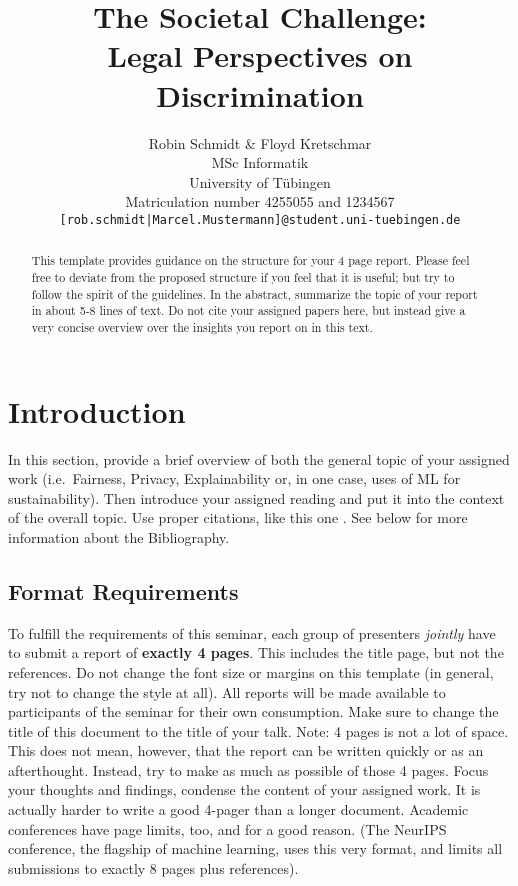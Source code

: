\documentclass{article}
\title{The Societal Challenge: \\ Legal Perspectives on Discrimination}
\author{%
  Robin Schmidt \& Floyd Kretschmar\\
  MSc Informatik \\
  University of Tübingen\\
  Matriculation number 4255055 and 1234567\\
  \texttt{[rob.schmidt|Marcel.Mustermann]@student.uni-tuebingen.de}
}
\begin{document}
\maketitle

\begin{abstract}
  This template provides guidance on the structure for your 4 page report. Please feel free to deviate from the proposed structure if you feel that it is useful; but try to follow the spirit of the guidelines.
  In the abstract, summarize the topic of your report in about 5-8 lines of text. Do not cite your assigned papers here, but instead give a very concise overview over the insights you report on in this text.
\end{abstract}

\section{Introduction}

In this section, provide a brief overview of both the general topic of your assigned work (i.e.~Fairness, Privacy, Explainability or, in one case, uses of ML for sustainability). Then introduce your assigned reading and put it into the context of the overall topic. Use proper citations, like this one \cite{Berk.2018}. See below for more information about the Bibliography.

\subsection{Format Requirements}

To fulfill the requirements of this seminar, each group of presenters \emph{jointly} have to submit a report of \textbf{exactly 4 pages}. This includes the title page, but not the references. Do not change the font size or margins on this template (in general, try not to change the style at all). All reports will be made available to participants of the seminar for their own consumption. Make sure to change the title of this document to the title of your talk. Note: 4 pages is not a lot of space. This does not mean, however, that the report can be written quickly or as an afterthought. Instead, try to make as much as possible of those 4 pages. Focus your thoughts and findings, condense the content of your assigned work. It is actually harder to write a good 4-pager than a longer document. Academic conferences have page limits, too, and for a good reason. (The NeurIPS conference, the flagship of machine learning, uses this very format, and limits all submissions to exactly 8 pages plus references).
\end{document}
